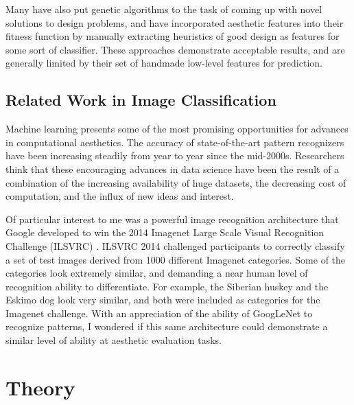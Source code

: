 \documentclass[midd]{thesis}
\begin{document}
Many have also put genetic algorithms to the task of coming up with novel solutions to design problems, and have incorporated aesthetic features into their fitness function by manually extracting heuristics of good design as features for some sort of classifier. These approaches demonstrate acceptable results, and are generally limited by their set of handmade low-level features for prediction. %


\section{Related Work in Image Classification}

Machine learning presents some of the most promising opportunities for advances in computational aesthetics. The accuracy of state-of-the-art pattern recognizers have been increasing steadily from year to year since the mid-2000s. Researchers think that these encouraging advances in data science have been the result of a combination of the increasing availability of huge datasets, the decreasing cost of computation, and the influx of new ideas and interest.

Of particular interest to me was a powerful image recognition architecture that Google developed to win the 2014 Imagenet Large Scale Visual Recognition Challenge (ILSVRC)  \cite{szegedy2014going}. ILSVRC 2014 challenged participants to correctly classify a set of test images derived from 1000 different Imagenet categories. Some of the categories look extremely similar, and demanding a near human level of recognition ability to differentiate. For example, the Siberian huskey and the Eskimo dog look very similar, and both were included as categories for the Imagenet challenge. With an appreciation of the ability of GoogLeNet to recognize patterns, I wondered if this same architecture could demonstrate a similar level of ability at aesthetic evaluation tasks.

\chapter{Theory}


\end{document}
